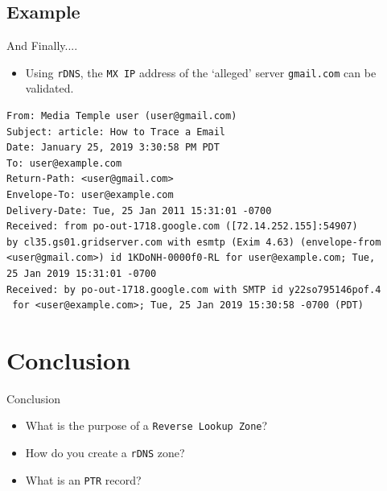 \documentclass[xcolor=table]{beamer}
\begin{document}
\subsection{Example}
\begin{frame}[fragile]{And Finally....}
  \begin{itemize}
    \item Using \texttt{rDNS}, the \texttt{MX IP} address of the `alleged' server \texttt{gmail.com} can be validated. 
  \end{itemize}
  \begin{tcolorbox}
    \lstset{
      basicstyle=\tiny\ttfamily,
    }
    \begin{lstlisting}
From: Media Temple user (user@gmail.com)
Subject: article: How to Trace a Email
Date: January 25, 2019 3:30:58 PM PDT
To: user@example.com
Return-Path: <user@gmail.com>
Envelope-To: user@example.com
Delivery-Date: Tue, 25 Jan 2011 15:31:01 -0700
Received: from po-out-1718.google.com ([72.14.252.155]:54907) 
by cl35.gs01.gridserver.com with esmtp (Exim 4.63) (envelope-from 
<user@gmail.com>) id 1KDoNH-0000f0-RL for user@example.com; Tue, 
25 Jan 2019 15:31:01 -0700
Received: by po-out-1718.google.com with SMTP id y22so795146pof.4
 for <user@example.com>; Tue, 25 Jan 2019 15:30:58 -0700 (PDT)
    \end{lstlisting}
  \end{tcolorbox}
\end{frame}

\section*{Conclusion}
\begin{frame}{Conclusion}
  \begin{itemize}
    \item What is the purpose of a \texttt{Reverse Lookup Zone}?
    \item How do you create a \texttt{rDNS} zone?
    \item What is an \texttt{PTR} record?
  \end{itemize}
\end{frame}
\end{document}
